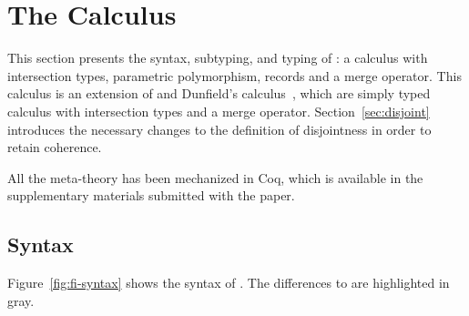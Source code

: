 \section{The \name Calculus}
\label{sec:fi}

This section presents the syntax, subtyping, and typing of \name: 
a calculus with intersection types, parametric polymorphism, records and a merge operator. 
This calculus is an extension of \oldname and Dunfield's
calculus~\cite{dunfield2014elaborating}, which are simply typed
calculus with intersection types and a merge operator.
Section~\ref{sec:disjoint} introduces the necessary changes to the
definition of disjointness in order to retain coherence.

All the meta-theory has been mechanized in Coq, which is available in
the supplementary materials submitted with the paper.

\subsection{Syntax}

Figure~\ref{fig:fi-syntax} shows the syntax of \name. 
The differences to \oldname are highlighted in gray.

